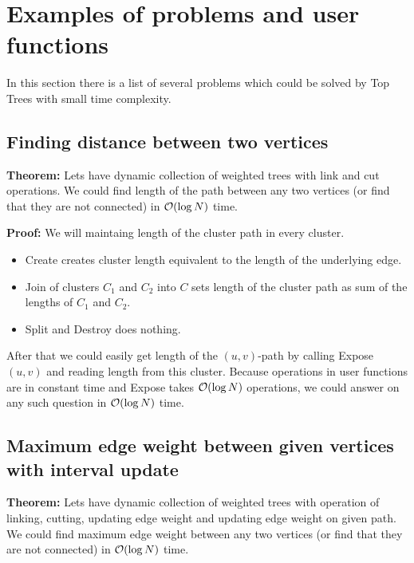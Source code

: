 \chapter{Examples of problems and user functions}

In this section there is a list of several problems which could be solved by
Top Trees with small time complexity.

\section{Finding distance between two vertices}

{\bf Theorem:} Lets have dynamic collection of weighted trees with link and cut
operations. We could find length of the path between any two vertices (or find
that they are not connected) in ${\cal O}(\log N)$ time.

\medskip\noindent
{\bf Proof:} We will maintaing length of the cluster path in every cluster.

\begin{itemize}

\item {\sc Create} creates cluster length equivalent to the length of the
underlying edge.

\item {\sc Join} of clusters $C_1$ and $C_2$ into $C$ sets length of the cluster
path as sum of the lengths of $C_1$ and $C_2$.

\item {\sc Split} and {\sc Destroy} does nothing.

\end{itemize}

After that we could easily get length of the $(u,v)$-path by calling
{\sc Expose}$(u,v)$ and reading length from this cluster. Because operations
in user functions are in constant time and {\sc Expose} takes ${\cal O}(\log N)$
operations, we could answer on any such question in ${\cal O}(\log N)$ time.


\section{Maximum edge weight between given vertices with interval update}

{\bf Theorem:} Lets have dynamic collection of weighted trees with operation of linking,
cutting, updating edge weight and updating edge weight on given path. We could
find maximum edge weight between any two vertices (or find that they are not
connected) in ${\cal O}(\log N)$ time.

